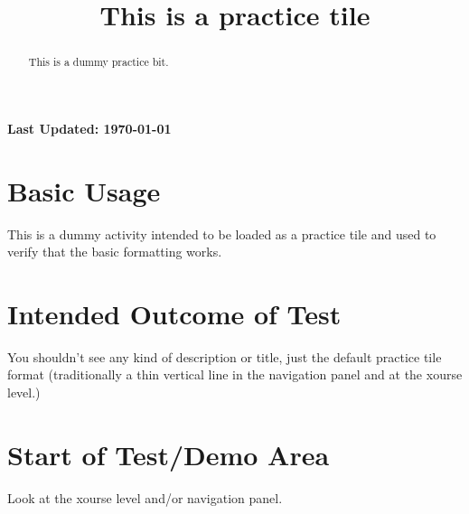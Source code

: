 \documentclass{ximera}
\title{This is a practice tile}
\begin{document}
\begin{abstract}
    This is a dummy practice bit.
\end{abstract}
\maketitle

{{\Huge \bfseries Last Updated: \today}} \\


\section{Basic Usage}
This is a dummy activity intended to be loaded as a practice tile and used to verify that the basic formatting works.\\

\section{Intended Outcome of Test}
You shouldn't see any kind of description or title, just the default practice tile format (traditionally a thin vertical line in the navigation panel
and at the xourse level.)

\section{Start of Test/Demo Area}
Look at the xourse level and/or navigation panel.

\hrulefill
\end{document}
